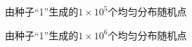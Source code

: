 \documentclass[a4paper,11pt]{article}
\begin{document}
\begin{figure}[!htbp]        
\caption{\label{1} 由种子“1”生成的$1 \times 10^{5}$个均匀分布随机点}      
\end{figure}

\begin{figure}[!htbp]        
\caption{\label{1} 由种子“1”生成的$1 \times 10^{6}$个均匀分布随机点}      
\end{figure}
\end{document}
